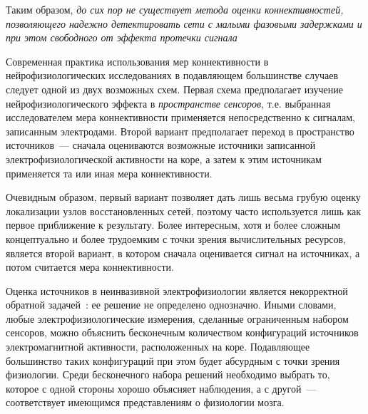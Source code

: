 Таким образом, \emph{до сих пор не существует метода оценки коннективностей,
позволяющего надежно детектировать сети с малыми фазовыми задержками и при этом свободного
от эффекта протечки сигнала}



Современная практика использования мер коннективности в нейрофизиологических
исследованиях в подавляющем большинстве случаев следует одной из двух возможных схем.
Первая схема предполагает изучение нейрофизиологического эффекта  в \emph{пространстве сенсоров},
т.е. выбранная исследователем мера коннективности применяется непосредственно к сигналам,
записанным электродами.
Второй вариант предполагает переход в пространство источников~--- сначала оцениваются
возможные источники записанной электрофизиологической активности на коре, а затем к этим
источникам применяется та или иная  мера коннективности.

Очевидным образом, первый вариант позволяет дать лишь весьма грубую оценку локализации
узлов восстановленных сетей, поэтому часто используется лишь как первое приближение к результату.
Более интересным, хотя и более сложным концептуально и более
трудоемким с точки зрения вычислительных ресурсов, является второй вариант, в котором
сначала оценивается сигнал на источниках, а потом считается мера коннективности.

Оценка источников в неинвазивной электрофизиологии является
некорректной обратной задачей~\cite{Hamalainen1993}:
ее решение не определено однозначно. Иными словами, любые электрофизиологические измерения,
сделанные ограниченным набором сенсоров, можно объяснить бесконечным количеством конфигураций
источников электромагнитной активности, расположенных на коре. Подавляющее большинство таких конфигураций
при этом будет абсурдным с точки зрения физиологии. Среди бесконечного набора
решений необходимо выбрать то, которое с одной стороны хорошо объясняет наблюдения, а с другой~---
соответствует имеющимся представлениям о физиологии мозга.

